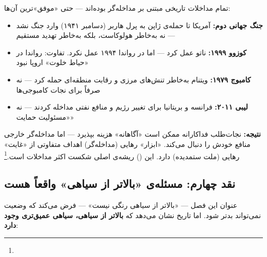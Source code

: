 \begin{tcolorbox}[defbox, title={واقعیت تلخ: هیچ مداخله‌ی «خیرخواهانه‌ی خالص» وجود ندارد}]
تمام مداخلات تاریخی مبتنی بر  مداخله‌گر بوده‌اند — حتی «موفق»ترین آن‌ها:

\begin{itemize}
\item \textbf{جنگ جهانی دوم:} آمریکا تا حمله‌ی ژاپن به پرل هاربر (دسامبر ۱۹۴۱) وارد جنگ نشد — نه به‌خاطر هولوکاست، بلکه به‌خاطر تهدید مستقیم
\item \textbf{کوزوو ۱۹۹۹:} ناتو عمل کرد — اما در رواندا ۱۹۹۴ عمل نکرد. تفاوت: رواندا در «حیاط خلوت» اروپا نبود
\item \textbf{کامبوج ۱۹۷۹:} ویتنام به‌خاطر تنش‌های مرزی و رقابت منطقه‌ای حمله کرد — نه صرفاً برای نجات کامبوجی‌ها
\item \textbf{لیبی ۲۰۱۱:} فرانسه و بریتانیا برای تغییر رژیم و منافع نفتی مداخله کردند — نه «مسئولیت حمایت»
\end{itemize}

\textbf{نتیجه:} نجات‌طلب فداکارانه ممکن است «آگاهانه» هزینه بپذیرد — اما مداخله‌گر خارجی منافع خودش را دنبال می‌کند. «ابزار» رهایی (مداخله‌گر) اهداف متفاوتی از «غایت» رهایی (ملت ستمدیده) دارد. این  () ریشه‌ی اصلی شکست اکثر مداخلات است.\footnote{}
\end{tcolorbox}

\subsection{نقد چهارم: مسئله‌ی «بالاتر از سیاهی» واقعاً هست}
\label{subsec:ch15-critique-worse-than-black}

عنوان این فصل — «بالاتر از سیاهی رنگی نیست» — فرض می‌کند که وضعیت نمی‌تواند بدتر شود. اما تاریخ نشان می‌دهد که \textbf{بالاتر از سیاهی، سیاهی عمیق‌تری وجود دارد}:

